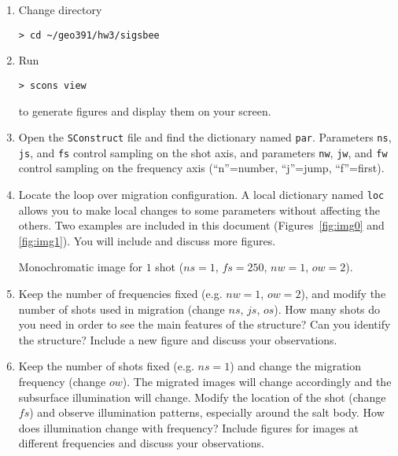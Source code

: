\begin{enumerate}
\item Change directory 

\begin{verbatim}
> cd ~/geo391/hw3/sigsbee
\end{verbatim}
  \item Run
\begin{verbatim}
> scons view
\end{verbatim}
to generate figures and display them on your screen.  

\item
Open the \texttt{SConstruct} file and 
find the dictionary named \texttt{par}.
Parameters 
\texttt{ns}, 
\texttt{js}, and
\texttt{fs} control sampling on the shot axis,
and parameters 
\texttt{nw}, 
\texttt{jw}, and 
\texttt{fw} control sampling on the 
frequency axis (``n''=number, ``j''=jump, ``f''=first).

\item
Locate the loop over migration configuration.
A local dictionary  named \texttt{loc} allows you to 
make local changes to some parameters without affecting
the others.
Two examples are included in this document
(Figures~\ref{fig:img0} and \ref{fig:img1}).
You will include and discuss more figures.

{Monochromatic image for $1$ shot 
($ns=1$, $fs=250$, $nw=1$, $ow=2$).}


\item
Keep the number of frequencies fixed 
(e.g. $nw=1$, $ow=2$),
and modify the number of shots used in migration
(change $ns$, $js$, $os$).
How many shots do you need in order to see the main 
features of the structure?
Can you identify the structure?
Include a new figure and discuss your observations.



\item
Keep the number of shots fixed (e.g. $ns=1$) 
and change the migration frequency (change $ow$).
The migrated images will change accordingly and
the subsurface illumination will change.
Modify the location of the shot (change $fs$)
and observe illumination patterns, especially around
the salt body.
How does illumination change with frequency?
Include figures for images at different frequencies
and discuss your observations.


\end{enumerate}
